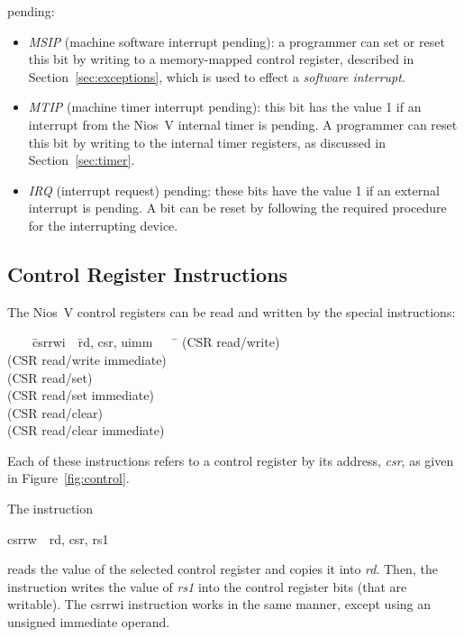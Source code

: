 \documentclass[11pt, twoside, pdftex]{article}
\newenvironment{ctabbing}%
{\begin{center}\begin{minipage}{\textwidth}\begin{tabbing}}
{\end{tabbing}\end{minipage}\end{center}}
\begin{document}
\begin{itemize}
pending: 
\begin{itemize}
\item {\it MSIP} (machine software interrupt pending): a programmer can set or reset this
bit by writing to a memory-mapped control register, described in Section~\ref{sec:exceptions}, 
which is used to effect a {\it software interrupt}.
\item {\it MTIP} (machine timer interrupt pending): this bit has the value 1 
if an interrupt from the Nios~V internal timer is pending. A programmer can reset this bit 
by writing to the internal timer registers, as discussed in Section~\ref{sec:timer}.
\item {\it IRQ} (interrupt request) pending: these bits have the value 1 if an external
interrupt is pending. A bit can be reset by following the required procedure for the
interrupting device. 
\end{itemize}
\end{itemize}
 
\subsection{Control Register Instructions}
\label{sec:csr_inst}

The Nios~V control registers can be read and written by the special instructions:
\begin{ctabbing}
~~~~\={\sf csrrwi}~~\={\sf rd, csr, uimm}~~~~\=\kill
{}  \>(CSR read/write)\\
  \>(CSR read/write immediate)\\
  \>(CSR read/set)\\
  \>(CSR read/set immediate)\\
  \>(CSR read/clear)\\
  \>(CSR read/clear immediate)\\
\end{ctabbing}
\vspace{-\baselineskip}
\noindent
Each of these instructions refers to a control register by its address, {\it csr}, as
given in Figure~\ref{fig:control}.

The instruction
\vspace{-\baselineskip}
\begin{center}
{\sf csrrw~~rd, csr, rs1} 
\end{center}
reads the value of the selected control register and copies it into {\it rd}. Then, the 
instruction writes the value of {\it rs1} into the control register bits (that are
writable). The {\sf csrrwi} instruction works in the same manner, except using an unsigned
immediate operand.
 
\end{document}
